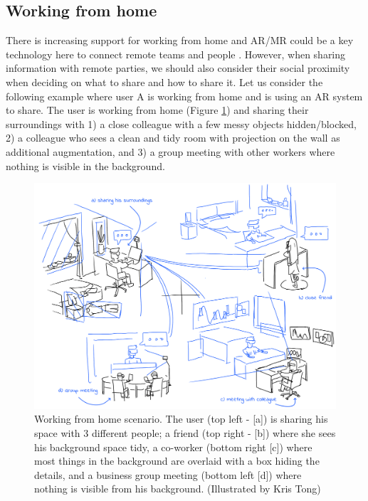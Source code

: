 
\subsection{Working from home}

There is increasing support for working from home \cite{Bloom2015, Crosbie2004, Olson1984} and AR/MR could be a key technology here to connect remote teams and people \cite{Koehne2012, Maarouf2012}. However, when sharing information with remote parties, we should also consider their social proximity when deciding on what to share and how to share it. Let us consider the following example where user A is working from home and is using an AR system to share. The user is working from home (Figure \ref{fig:illustration:group-meeting}) and sharing their surroundings with 1) a close colleague with a few messy objects hidden/blocked, 2) a colleague who sees a clean and tidy room with projection on the wall as additional augmentation, and 3) a group meeting with other workers where nothing is visible in the background. 

\begin{figure}[ht]
    \centering
    \includegraphics[width=\linewidth]{images/30-continuum/illustrations/2_Group_Meeting.png}
    \caption{Working from home scenario. The user (top left - [a]) is sharing his space with 3 different people; a friend (top right - [b]) where she sees his background space tidy, a co-worker (bottom right [c]) where most things in the background are overlaid with a box hiding the details, and a business group meeting (bottom left [d]) where nothing is visible from his background.
    (Illustrated by Kris Tong)}
    \label{fig:illustration:group-meeting}
\end{figure}

